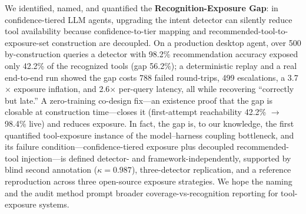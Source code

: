 We identified, named, and quantified the \textbf{Recognition-Exposure Gap}: in confidence-tiered LLM agents, upgrading the intent detector can silently reduce tool availability because confidence-to-tier mapping and recommended-tool-to-exposure-set construction are decoupled. On a production desktop agent, over 500 by-construction queries a detector with 98.2\% recommendation accuracy exposed only 42.2\% of the recognized tools (gap 56.2\%); a deterministic replay and a real end-to-end run showed the gap costs 788 failed round-trips, 499 escalations, a 3.7$\times$ exposure inflation, and 2.6$\times$ per-query latency, all while recovering ``correctly but late.'' A zero-training co-design fix---an existence proof that the gap is closable at construction time---closes it (first-attempt reachability 42.2\% $\rightarrow$ 98.4\% live) and reduces exposure. In fact, the gap is, to our knowledge, the first quantified tool-exposure instance of the model--harness coupling bottleneck, and its failure condition---confidence-tiered exposure plus decoupled recommended-tool injection---is defined detector- and framework-independently, supported by blind second annotation ($\kappa=0.987$), three-detector replication, and a reference reproduction across three open-source exposure strategies. We hope the naming and the audit method prompt broader coverage-vs-recognition reporting for tool-exposure systems.
